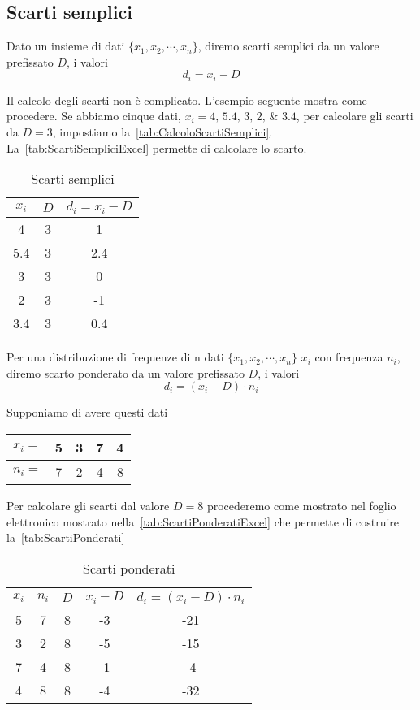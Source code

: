 \subsection{Scarti semplici}
\begin{defn}
Dato un insieme di dati  $\lbrace x_{1},x_{2},\cdots,x_{n}\rbrace$, diremo scarti semplici da un valore prefissato $D$,  i valori \[d_{i}=x_{i}-D \]
\end{defn}
Il calcolo degli scarti non è complicato. L'esempio seguente mostra come procedere. Se abbiamo cinque dati, $x_{i}=\numlist{4;5.4;3;2;3.4}$, per calcolare gli scarti da $D=3$, impostiamo  la~\vref{tab:CalcoloScartiSemplici}. La~\vref{tab:ScartiSempliciExcel} permette di calcolare lo scarto. 
\begin{table}
	\centering
	\begin{tabular}{S[table-format=1.1]S[table-format=1.0]S[table-format=1.1]}
		\toprule
		{$x_{i}$}& {$D$} &{$d_{i}=x_{i}-D$}  \\ 
		&  3& 1 \\ 
		5.4& 3 &2.4  \\ 
		3&  3& 0 \\ 
		2&  3& -1 \\ 
		3.4&3 &0.4\\
		\bottomrule
	\end{tabular} 
	\caption{Scarti semplici}
	\label{tab:CalcoloScartiSemplici}
\end{table}
\begin{defn}
Per una distribuzione di frequenze di n dati $\lbrace x_{1},x_{2},\cdots,x_{n}\rbrace$ $x_{i}$ con frequenza  $n_{i}$,  diremo scarto ponderato da un valore prefissato $D$,  i valori \[d_{i}=(x_{i}-D)\cdot n_{i} \]
\end{defn}
Supponiamo di avere questi dati 
\begin{center}
	\begin{tabular}{l*{4} {S[table-format=1.0]}}
		{$x_{i}=$}	&5  &3  &7  &4  \\
		\midrule 
		{$n_{i}=$}	& 7 &2  & 4 & 8 \\ 
	\end{tabular}
\end{center}
Per calcolare gli  scarti dal valore $D=8$  procederemo come mostrato nel foglio elettronico mostrato nella~\vref*{tab:ScartiPonderatiExcel} che permette di costruire la~\vref{tab:ScartiPonderati}
\begin{table}
	\centering
	\begin{tabular}{*{4} {S[table-format=1.0]}S[table-format=2.0]}
		\toprule
		{$x_{i}$} & {$n_{i}$ } & {$D$} & {$x_{i}-D $} & {$d_{i}=(x_{i}-D ) \cdot n_{i}$} \\ 
		& 7 &8  & -3 & -21 \\ 
		3&  2& 8 &  -5& -15 \\ 
		7&  4& 8 &  -1&  -4\\ 
		4&  8& 8 & -4 & -32 \\ 
		\bottomrule
	\end{tabular} 
	\caption{Scarti ponderati}
	\label{tab:ScartiPonderati}
\end{table}

